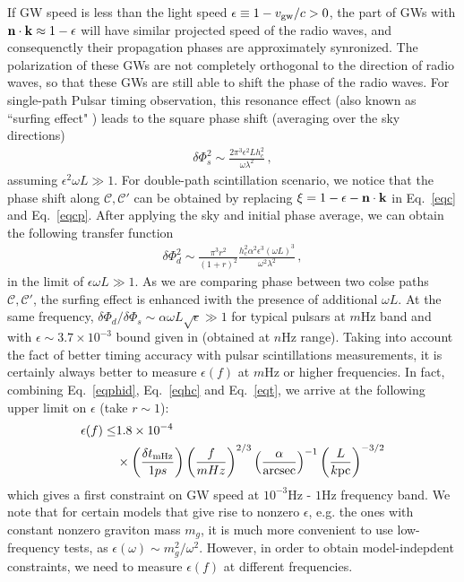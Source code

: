 \documentclass[prl,aps,floatfix,superscriptaddress,twocolumn]{revtex4}
\begin{document}
If GW speed is less than the light speed $\epsilon \equiv 1-v_{\rm gw}/c > 0$, the part of GWs with ${\bf n}\cdot {\bf k} \approx 1-\epsilon$ will have similar projected speed of the radio waves, and consequenctly their propagation phases are approximately synronized. The polarization of these GWs are not completely orthogonal to the direction of radio waves, so that these GWs are still able to shift the phase of the radio waves. For single-path Pulsar timing observation, this resonance effect (also known as ``surfing effect" \cite{Aoyama2014, Polnarev2008}) leads to the square phase shift (averaging over the sky directions)
\begin{align}
\delta \Phi^2_s \sim \frac{2\pi^3 \epsilon^2 L h_c^2}{ \omega \lambda^2}\,,
\end{align} 
assuming $\epsilon^2 \omega L \gg 1$. For double-path scintillation scenario, we notice that the phase shift along $\mathcal{C}, \mathcal{C}'$ can be obtained by replacing $\xi = 1-\epsilon-{\bf n}\cdot {\bf k}$ in Eq.~\ref{eqc} and Eq.~\ref{eqcp}. After applying the sky and initial phase average, we can obtain the following transfer function  
\begin{align}\label{eqphid}
\delta \Phi^2_d \sim \frac{\pi^3 r^2}{(1+r)^2} \frac{h_c^2\alpha^2 \epsilon^3 (\omega L)^3}{\omega^2 \lambda^2}\,,
\end{align}
in the limit of $\epsilon \omega L \gg 1$. As we are comparing phase between two colse paths $\mathcal{C}, \mathcal{C}'$, the surfing effect is enhanced iwith the presence of additional $\omega L$. At the same frequency, $\delta \Phi_d/\delta \Phi_s \sim \alpha \omega L\sqrt{\epsilon} \gg 1$ for typical pulsars at $m$Hz band and with $\epsilon \sim 3.7 \times 10^{-3}$ bound given in \cite{Aoyama2014} (obtained at $n$Hz range). Taking into account the fact of better timing accuracy with pulsar scintillations measurements, it is certainly always better to measure $\epsilon(f)$ at $m$Hz or higher frequencies. In fact, combining Eq.~\ref{eqphid}, Eq.~\ref{eqhc} and Eq.~\ref{eqt}, we arrive at the following upper limit on $\epsilon$ (take $r \sim 1$): 
\begin{align}
\epsilon(f) \le& 1.8\times 10^{-4} \nonumber\\ 
&\times \left ( \frac{\delta t_{\rm mHz}}{1 ps}\right )  \left (\frac{f}{ m Hz} \right )^{2/3} \left (\frac{\alpha}{{\rm arcsec}} \right )^{-1} \left ( \frac{L}{k {\rm pc}}\right)^{-3/2}
\end{align}
which gives a first constraint on GW speed at $10^{-3}$Hz - $1$Hz frequency band. We note that for certain models that give rise to nonzero $\epsilon$, e.g. the ones with constant nonzero graviton mass $m_g$, it is much more convenient to use low-frequency tests, as $\epsilon(\omega) \sim m^2_g/\omega^2$. However, in order to obtain model-indepdent constraints, we need to measure $\epsilon(f)$ at different frequencies.
\vspace{0.2cm}
\end{document}
